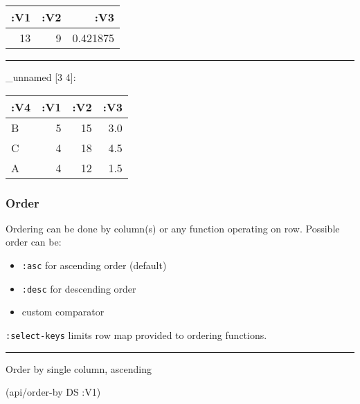 \documentclass[]{article}
\newenvironment{Shaded}{\begin{snugshade}}{\end{snugshade}}
\newcommand{\KeywordTok}[1]{\textcolor[rgb]{0.13,0.29,0.53}{\textbf{#1}}}
\newcommand{\VariableTok}[1]{\textcolor[rgb]{0.00,0.00,0.00}{#1}}
\newcommand{\AttributeTok}[1]{\textcolor[rgb]{0.77,0.63,0.00}{#1}}
\newcommand{\NormalTok}[1]{#1}
\providecommand{\tightlist}{%
  \setlength{\itemsep}{0pt}\setlength{\parskip}{0pt}}
\begin{document}
\begin{longtable}[]{@{}rrr@{}}
\toprule
:V1 & :V2 & :V3\tabularnewline
\midrule
\endhead
13 & 9 & 0.421875\tabularnewline
\bottomrule
\end{longtable}

\begin{center}\rule{0.5\linewidth}{0.5pt}\end{center}

\begin{Shaded}
\end{Shaded}

\_unnamed {[}3 4{]}:

\begin{longtable}[]{@{}lrrr@{}}
\toprule
:V4 & :V1 & :V2 & :V3\tabularnewline
\midrule
\endhead
B & 5 & 15 & 3.0\tabularnewline
C & 4 & 18 & 4.5\tabularnewline
A & 4 & 12 & 1.5\tabularnewline
\bottomrule
\end{longtable}

\subsubsection{Order}\label{order}

Ordering can be done by column(s) or any function operating on row.
Possible order can be:

\begin{itemize}
\tightlist
\item
  \texttt{:asc} for ascending order (default)
\item
  \texttt{:desc} for descending order
\item
  custom comparator
\end{itemize}

\texttt{:select-keys} limits row map provided to ordering functions.

\begin{center}\rule{0.5\linewidth}{0.5pt}\end{center}

Order by single column, ascending

\begin{Shaded}
\begin{Highlighting}[]
\NormalTok{(api/order-by DS }\AttributeTok{:V1}\NormalTok{)}
\end{Highlighting}
\end{Shaded}
\end{document}
